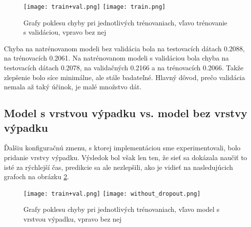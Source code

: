 	\begin{figure}[H]
			\texttt{[image: train+val.png]}
			\texttt{[image: train.png]}
		\caption[Trénovanie s validáciou vs. trénovanie bez validácie]{Grafy poklesu chyby pri jednotlivých trénovaniach, vľavo trénovanie s validáciou, vpravo bez nej}\label{validation_graph}
	\end{figure}
	
Chyba na natrénovanom modeli bez validácia bola na testovacích dátach 0.2088, na trénovacích 0.2061. Na natrénovanom modeli s validáciou bola chyba na testovacích dátach 0.2078, na validačných 0.2166 a na trénovacích 0.2066. Takže zlepšenie bolo síce minimálne, ale stále badateľné. Hlavný dôvod, prečo validácia nemala až taký účinok, je malé množstvo dát. 

\subsection{Model s vrstvou výpadku vs. model bez vrstvy výpadku}
\label{model_graph}
\label{dropout_vs_nodropout}
Ďalšiu konfiguračnú zmenu, s ktorej implementáciou sme experimentovali, bolo pridanie vrstvy výpadku. Výsledok bol však len ten, že sieť sa dokázala naučiť to isté za rýchlejší čas, predikcie sa ale nezlepšili, ako je vidieť na nasledujúcich grafoch na obrázku \ref{dropout}. 

	\begin{figure}[H]
		
		\texttt{[image: train+val.png]}
		\texttt{[image: without\_dropout.png]}
		\caption[Model s vrstvou výpadku vs. bez nej]{Grafy poklesu chyby pri jednotlivých trénovaniach, vľavo model s vrstvou výpadku, vpravo bez nej}\label{dropout}
	\end{figure}
	
\fi